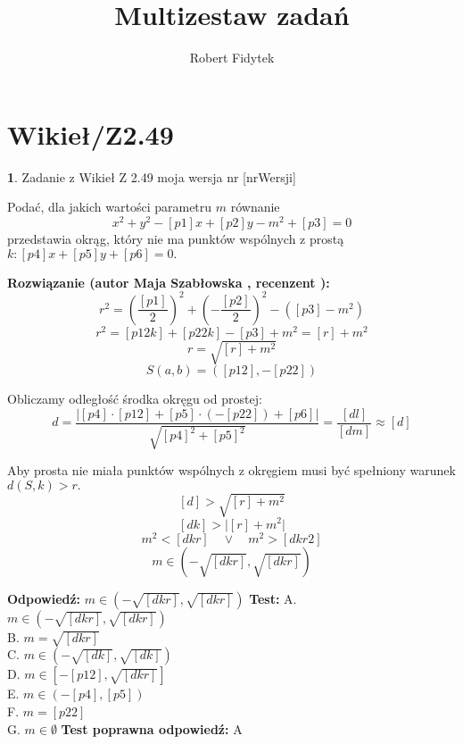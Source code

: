 \documentclass[12pt, a4paper]{article}
\title{Multizestaw zadań}
\author{Robert Fidytek}
\date{}
\theoremstyle{definition} %
\newtheorem{zad}{}
\newcommand{\kategoria}[1]{\section{#1}} %
\newcommand{\zadStart}[1]{\begin{zad}#1\newline} %
\newcommand{\zadStop}{\end{zad}}   %
\newcommand{\rozwStart}[2]{\noindent \textbf{Rozwiązanie (autor #1 , recenzent #2): }\newline} %
\newcommand{\rozwStop}{\newline}                                            %
\newcommand{\odpStart}{\noindent \textbf{Odpowiedź:}\newline}    %
\newcommand{\odpStop}{\newline}                                             %
\newcommand{\testStart}{\noindent \textbf{Test:}\newline} %
\newcommand{\testStop}{\newline} %
\newcommand{\kluczStart}{\noindent \textbf{Test poprawna odpowiedź:}\newline} %
\newcommand{\kluczStop}{\newline} %
\begin{document}
\maketitle


\kategoria{Wikieł/Z2.49}
\zadStart{Zadanie z Wikieł Z 2.49 moja wersja nr [nrWersji]}


Podać, dla jakich wartości parametru $m$ równanie
$$x^{2}+y^{2}-[p1]x+[p2]y-m^{2}+[p3]=0$$
przedstawia okrąg, który nie ma punktów wspólnych z prostą $k: [p4]x+[p5]y+[p6]=0.$

\zadStop

\rozwStart{Maja Szabłowska}{}
$$r^{2}=\left(\frac{[p1]}{2}\right)^{2}+\left(-\frac{[p2]}{2}\right)^{2}-([p3]-m^{2})$$
$$r^{2}=[p12k]+[p22k]-[p3]+m^{2}=[r]+m^{2}$$
$$r=\sqrt{[r]+m^{2}}$$
$$S(a,b)=([p12],-[p22])$$

Obliczamy odległość środka okręgu od prostej:
$$d=\frac{|[p4]\cdot[p12]+[p5]\cdot(-[p22])+[p6]|}{\sqrt{[p4]^{2}+[p5]^{2}}}=\frac{[dl]}{[dm]}\approx [d]$$

Aby prosta nie miała punktów wspólnych z okręgiem musi być spełniony warunek $d(S,k)>r.$
$$[d]>\sqrt{[r]+m^{2}}$$
$$[dk]>\big|[r]+m^{2}\big|$$
$$m^{2}<[dkr]\quad \vee \quad m^{2}>[dkr2]$$
$$m\in(-\sqrt{[dkr]}, \sqrt{[dkr]})$$
\rozwStop


\odpStart
$m\in(-\sqrt{[dkr]}, \sqrt{[dkr]})$
\odpStop
\testStart
A. $m\in(-\sqrt{[dkr]}, \sqrt{[dkr]})$\\
B. $m=\sqrt{[dkr]}$\\
C. $m\in(-\sqrt{[dk]}, \sqrt{[dk]})$\\
D. $m\in[-[p12], \sqrt{[dkr]}]$\\
E. $m\in(-[p4], [p5])$\\
F. $m=[p22]$\\
G. $m\in\emptyset$
\testStop
\kluczStart
A
\kluczStop
\end{document}
